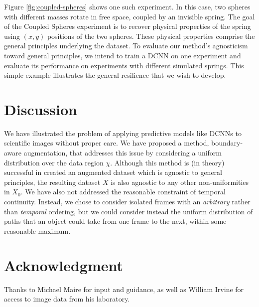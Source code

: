 \documentclass[10pt, journal]{IEEEtran}
\begin{document}
Figure \ref{fig:coupled-spheres} shows one such experiment. In this case, two
spheres with different masses rotate in free space, coupled by an invisible
spring. The goal of the Coupled Spheres experiment is to recover physical
properties of the spring using $(x,y)$ positions of the two spheres. These
physical properties comprise the general principles underlying the dataset. To
evaluate our method's agnosticism toward general principles, we intend to train
a DCNN on one experiment and evaluate its performance on experiments with
different simulated springs. This simple example illustrates the general
resilience that we wish to develop.

\section{Discussion}
\label{sec:discussion}

We have illustrated the problem of applying predictive models like DCNNs to
scientific images without proper care. We have proposed a method, boundary-aware
augmentation, that addresses this issue by considering a uniform distribution
over the data region $\chi$. Although this method is (in theory) successful in
created an augmented dataset which is agnostic to general principles, the
resulting dataset $X$ is also agnostic to any other non-uniformities in
$X_0$. We have also not addressed the reasonable constraint of temporal
continuity. Instead, we chose to consider isolated frames with an
\emph{arbitrary} rather than \emph{temporal} ordering, but we could consider
instead the uniform distribution of paths that an object could take from one
frame to the next, within some reasonable maximum.




\section*{Acknowledgment}
\label{sec:acknowledgment}

Thanks to Michael Maire for input and guidance, as well as William Irvine for
access to image data from his laboratory.



\end{document}
